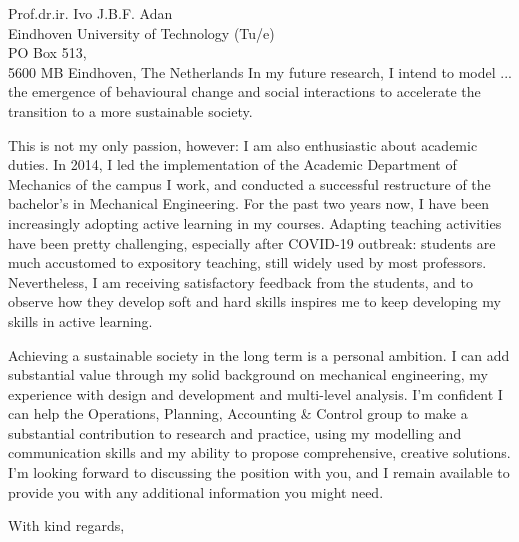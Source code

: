\documentclass[sender,
    paper=a4,
    version=last,
    fontsize=12pt,
    DIV=12,
    BCOR=0mm]{scrlttr2}
\begin{document}
\begin{letter}{
    Prof.dr.ir. Ivo J.B.F. Adan \\
    Eindhoven University of Technology (Tu/e)\\
    PO Box 513, \\
    5600 MB Eindhoven, The Netherlands
}
In my future research, I intend to model ... the emergence of behavioural change and social interactions to accelerate the transition to a more sustainable society. 

This is not my only passion, however: I am also enthusiastic about academic duties. In 2014, I led the implementation of the Academic Department of Mechanics of the campus I work, and conducted a successful restructure of the bachelor's in Mechanical Engineering. For the past two years now, I have been increasingly adopting active learning in my courses. Adapting teaching activities have been pretty challenging, especially after COVID-19 outbreak: students are much accustomed to expository teaching, still widely used by most professors. Nevertheless, I am receiving satisfactory feedback from the students, and to observe how they develop soft and hard skills inspires me to keep developing my skills in active learning. 

Achieving a sustainable society in the long term is a personal ambition. I can add substantial value through my solid background on mechanical engineering, my experience with design and development and multi-level analysis. I'm confident I can help the Operations, Planning, Accounting \& Control group to make a substantial contribution to research and practice, using my modelling and communication skills and my ability to propose comprehensive, creative solutions. I’m looking forward to discussing the position with you, and I remain available to provide you with any additional information you might need.

\closing{With kind regards,} %
\vfill
{}
\end{letter}
\end{document}
